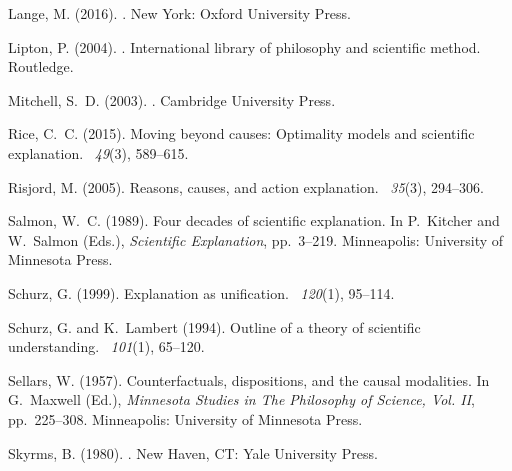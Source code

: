 \documentclass[natbib]{svjour3}                     %
\begin{document}
\begin{thebibliography}{19}
Lange, M. (2016).
.
\newblock New York: Oxford University Press.

Lipton, P. (2004).
.
\newblock International library of philosophy and scientific method. Routledge.

Mitchell, S.~D. (2003).
.
\newblock Cambridge University Press.

Rice, C.~C. (2015).
\newblock Moving beyond causes: Optimality models and scientific explanation.
~{\em 49\/}(3), 589--615.

Risjord, M. (2005).
\newblock Reasons, causes, and action explanation.
~{\em 35\/}(3), 294--306.

Salmon, W.~C. (1989).
\newblock Four decades of scientific explanation.
\newblock In P.~Kitcher and W.~Salmon (Eds.), {\em Scientific Explanation},
pp.\  3--219. Minneapolis: University of Minnesota Press.

Schurz, G. (1999).
\newblock Explanation as unification.
~{\em 120\/}(1), 95--114.

Schurz, G. and K.~Lambert (1994).
\newblock Outline of a theory of scientific understanding.
~{\em 101\/}(1), 65--120.

Sellars, W. (1957).
\newblock Counterfactuals, dispositions, and the causal modalities.
\newblock In G.~Maxwell (Ed.), {\em Minnesota Studies in The Philosophy of
	Science, Vol. II}, pp.\  225--308. Minneapolis: University of Minnesota
Press.

Skyrms, B. (1980).
.
\newblock New Haven, CT: Yale University Press.


\end{thebibliography}
\end{document}
